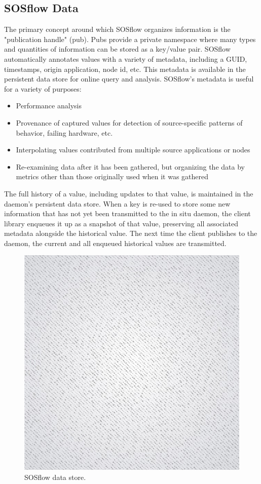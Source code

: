 \subsection{SOSflow Data}
%
The primary concept around which SOSflow organizes information is the
"publication handle" (pub).
%
Pubs provide a private namespace where many types and quantities of
information can be stored as a key/value pair.
%
SOSflow automatically annotates values with a variety of metadata,
including a GUID, timestamps, origin application, node id, etc.
%
This metadata is available in the persistent data store for online query
and analysis.
%
SOSflow's metadata is useful for a variety of purposes:
\begin{itemize}
    \item Performance analysis
    \item Provenance of captured values for detection of
        source-specific patterns of behavior, failing
        hardware, etc.
    \item Interpolating values contributed from multiple
        source applications or nodes
    \item Re-examining data after it has been gathered, but
        organizing the data by metrics other than those
        originally used when it was gathered
\end{itemize}
%
%
\par
%
The full history of a value, including updates to that value, is maintained
in the daemon's persistent data store.
%
When a key is re-used to store some new information that has not yet been
transmitted to the in situ daemon, the client library enqueues it up as
a snapshot of that value, preserving all associated metadata alongside the
historical value.
%
The next time the client publishes to the daemon, the current and all
enqueued historical values are transmitted.
%
\begin{figure}[h]
\centering
\includegraphics[width=\columnwidth]{images/placeholder.jpg}
\caption{SOSflow data store.}
\label{fig_data_store}
\end{figure}
